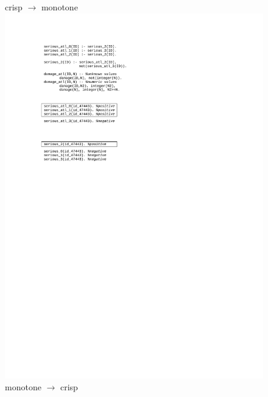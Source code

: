 \documentclass[authoryear,12pt]{elsarticle}
\begin{document}
\begin{figure}[ht]
\hspace{0.5cm}
\begin{minipage}[b]{0.5\hsize}
crisp $\rightarrow$ monotone\\
	{\centering
		\includegraphics[width=\hsize]{img/nomon2monot}}
monotone $\rightarrow$ crisp\\
	{\centering
}
\end{minipage}
\end{figure}
\end{document}
